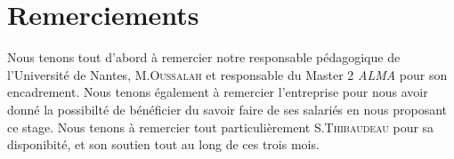 \chapter*{Remerciements}
{}
Nous tenons tout d'abord à remercier notre responsable pédagogique de l'Université de Nantes, M.\textsc{Oussalah} et responsable du Master 2 \emph{ALMA} pour son encadrement.
Nous tenons également à remercier l’entreprise \kwobeo{} pour nous avoir donné la possibilté de bénéficier du savoir faire de ses salariés en nous proposant ce stage. Nous tenons à remercier tout particulièrement S.\textsc{Thibaudeau} pour sa disponibité, et son soutien tout au long de ces trois mois.

